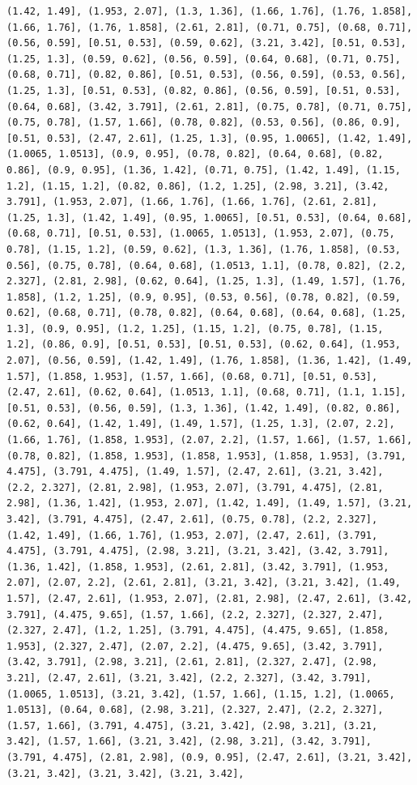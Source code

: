 \documentclass[12pt,fleqn]{article}\usepackage{../common}
\begin{document}
\begin{verbatim}
(1.42, 1.49], (1.953, 2.07], (1.3, 1.36], (1.66, 1.76], (1.76, 1.858], (1.66, 1.76], (1.76, 1.858], (2.61, 2.81], (0.71, 0.75], (0.68, 0.71], (0.56, 0.59], [0.51, 0.53], (0.59, 0.62], (3.21, 3.42], [0.51, 0.53], (1.25, 1.3], (0.59, 0.62], (0.56, 0.59], (0.64, 0.68], (0.71, 0.75], (0.68, 0.71], (0.82, 0.86], [0.51, 0.53], (0.56, 0.59], (0.53, 0.56], (1.25, 1.3], [0.51, 0.53], (0.82, 0.86], (0.56, 0.59], [0.51, 0.53], (0.64, 0.68], (3.42, 3.791], (2.61, 2.81], (0.75, 0.78], (0.71, 0.75], (0.75, 0.78], (1.57, 1.66], (0.78, 0.82], (0.53, 0.56], (0.86, 0.9], [0.51, 0.53], (2.47, 2.61], (1.25, 1.3], (0.95, 1.0065], (1.42, 1.49], (1.0065, 1.0513], (0.9, 0.95], (0.78, 0.82], (0.64, 0.68], (0.82, 0.86], (0.9, 0.95], (1.36, 1.42], (0.71, 0.75], (1.42, 1.49], (1.15, 1.2], (1.15, 1.2], (0.82, 0.86], (1.2, 1.25], (2.98, 3.21], (3.42, 3.791], (1.953, 2.07], (1.66, 1.76], (1.66, 1.76], (2.61, 2.81], (1.25, 1.3], (1.42, 1.49], (0.95, 1.0065], [0.51, 0.53], (0.64, 0.68], (0.68, 0.71], [0.51, 0.53], (1.0065, 1.0513], (1.953, 2.07], (0.75, 0.78], (1.15, 1.2], (0.59, 0.62], (1.3, 1.36], (1.76, 1.858], (0.53, 0.56], (0.75, 0.78], (0.64, 0.68], (1.0513, 1.1], (0.78, 0.82], (2.2, 2.327], (2.81, 2.98], (0.62, 0.64], (1.25, 1.3], (1.49, 1.57], (1.76, 1.858], (1.2, 1.25], (0.9, 0.95], (0.53, 0.56], (0.78, 0.82], (0.59, 0.62], (0.68, 0.71], (0.78, 0.82], (0.64, 0.68], (0.64, 0.68], (1.25, 1.3], (0.9, 0.95], (1.2, 1.25], (1.15, 1.2], (0.75, 0.78], (1.15, 1.2], (0.86, 0.9], [0.51, 0.53], [0.51, 0.53], (0.62, 0.64], (1.953, 2.07], (0.56, 0.59], (1.42, 1.49], (1.76, 1.858], (1.36, 1.42], (1.49, 1.57], (1.858, 1.953], (1.57, 1.66], (0.68, 0.71], [0.51, 0.53], (2.47, 2.61], (0.62, 0.64], (1.0513, 1.1], (0.68, 0.71], (1.1, 1.15], [0.51, 0.53], (0.56, 0.59], (1.3, 1.36], (1.42, 1.49], (0.82, 0.86], (0.62, 0.64], (1.42, 1.49], (1.49, 1.57], (1.25, 1.3], (2.07, 2.2], (1.66, 1.76], (1.858, 1.953], (2.07, 2.2], (1.57, 1.66], (1.57, 1.66], (0.78, 0.82], (1.858, 1.953], (1.858, 1.953], (1.858, 1.953], (3.791, 4.475], (3.791, 4.475], (1.49, 1.57], (2.47, 2.61], (3.21, 3.42], (2.2, 2.327], (2.81, 2.98], (1.953, 2.07], (3.791, 4.475], (2.81, 2.98], (1.36, 1.42], (1.953, 2.07], (1.42, 1.49], (1.49, 1.57], (3.21, 3.42], (3.791, 4.475], (2.47, 2.61], (0.75, 0.78], (2.2, 2.327], (1.42, 1.49], (1.66, 1.76], (1.953, 2.07], (2.47, 2.61], (3.791, 4.475], (3.791, 4.475], (2.98, 3.21], (3.21, 3.42], (3.42, 3.791], (1.36, 1.42], (1.858, 1.953], (2.61, 2.81], (3.42, 3.791], (1.953, 2.07], (2.07, 2.2], (2.61, 2.81], (3.21, 3.42], (3.21, 3.42], (1.49, 1.57], (2.47, 2.61], (1.953, 2.07], (2.81, 2.98], (2.47, 2.61], (3.42, 3.791], (4.475, 9.65], (1.57, 1.66], (2.2, 2.327], (2.327, 2.47], (2.327, 2.47], (1.2, 1.25], (3.791, 4.475], (4.475, 9.65], (1.858, 1.953], (2.327, 2.47], (2.07, 2.2], (4.475, 9.65], (3.42, 3.791], (3.42, 3.791], (2.98, 3.21], (2.61, 2.81], (2.327, 2.47], (2.98, 3.21], (2.47, 2.61], (3.21, 3.42], (2.2, 2.327], (3.42, 3.791], (1.0065, 1.0513], (3.21, 3.42], (1.57, 1.66], (1.15, 1.2], (1.0065, 1.0513], (0.64, 0.68], (2.98, 3.21], (2.327, 2.47], (2.2, 2.327], (1.57, 1.66], (3.791, 4.475], (3.21, 3.42], (2.98, 3.21], (3.21, 3.42], (1.57, 1.66], (3.21, 3.42], (2.98, 3.21], (3.42, 3.791], (3.791, 4.475], (2.81, 2.98], (0.9, 0.95], (2.47, 2.61], (3.21, 3.42], (3.21, 3.42], (3.21, 3.42], (3.21, 3.42], 
\end{verbatim}
\end{document}
